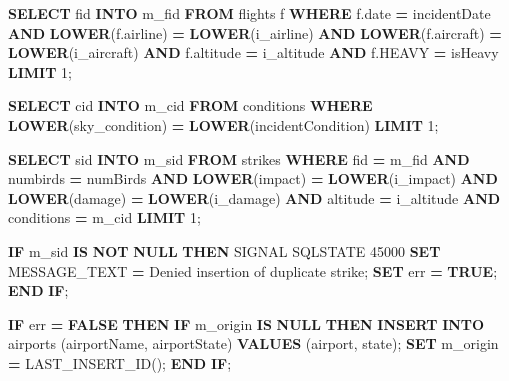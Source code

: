 \documentclass[
]{article}
\newenvironment{Shaded}{\begin{snugshade}}{\end{snugshade}}
\newcommand{\ControlFlowTok}[1]{\textcolor[rgb]{0.13,0.29,0.53}{\textbf{#1}}}
\newcommand{\DataTypeTok}[1]{\textcolor[rgb]{0.13,0.29,0.53}{#1}}
\newcommand{\DecValTok}[1]{\textcolor[rgb]{0.00,0.00,0.81}{#1}}
\newcommand{\FunctionTok}[1]{\textcolor[rgb]{0.13,0.29,0.53}{\textbf{#1}}}
\newcommand{\KeywordTok}[1]{\textcolor[rgb]{0.13,0.29,0.53}{\textbf{#1}}}
\newcommand{\NormalTok}[1]{#1}
\newcommand{\OperatorTok}[1]{\textcolor[rgb]{0.81,0.36,0.00}{\textbf{#1}}}
\newcommand{\StringTok}[1]{\textcolor[rgb]{0.31,0.60,0.02}{#1}}
\begin{document}
\begin{Shaded}
\begin{Highlighting}[]
    \KeywordTok{SELECT}\NormalTok{ fid }\KeywordTok{INTO}\NormalTok{ m\_fid }
    \KeywordTok{FROM}\NormalTok{ flights f }
    \KeywordTok{WHERE}\NormalTok{ f.}\DataTypeTok{date} \OperatorTok{=}\NormalTok{ incidentDate }
        \KeywordTok{AND} \FunctionTok{LOWER}\NormalTok{(f.airline) }\OperatorTok{=} \FunctionTok{LOWER}\NormalTok{(i\_airline) }
        \KeywordTok{AND} \FunctionTok{LOWER}\NormalTok{(f.aircraft) }\OperatorTok{=} \FunctionTok{LOWER}\NormalTok{(i\_aircraft) }
        \KeywordTok{AND}\NormalTok{ f.altitude }\OperatorTok{=}\NormalTok{ i\_altitude }
        \KeywordTok{AND}\NormalTok{ f.HEAVY }\OperatorTok{=}\NormalTok{ isHeavy }
    \KeywordTok{LIMIT} \DecValTok{1}\NormalTok{;}
    
    \KeywordTok{SELECT}\NormalTok{ cid }\KeywordTok{INTO}\NormalTok{ m\_cid }
    \KeywordTok{FROM}\NormalTok{ conditions }
    \KeywordTok{WHERE} \FunctionTok{LOWER}\NormalTok{(sky\_condition) }\OperatorTok{=} \FunctionTok{LOWER}\NormalTok{(incidentCondition) }
    \KeywordTok{LIMIT} \DecValTok{1}\NormalTok{;}
    
    \KeywordTok{SELECT}\NormalTok{ sid }\KeywordTok{INTO}\NormalTok{ m\_sid}
    \KeywordTok{FROM}\NormalTok{ strikes}
    \KeywordTok{WHERE}\NormalTok{ fid }\OperatorTok{=}\NormalTok{ m\_fid }\KeywordTok{AND}\NormalTok{ numbirds }\OperatorTok{=}\NormalTok{ numBirds }\KeywordTok{AND} \FunctionTok{LOWER}\NormalTok{(impact) }\OperatorTok{=} \FunctionTok{LOWER}\NormalTok{(i\_impact) }\KeywordTok{AND} \FunctionTok{LOWER}\NormalTok{(damage) }\OperatorTok{=} \FunctionTok{LOWER}\NormalTok{(i\_damage) }\KeywordTok{AND}\NormalTok{ altitude }\OperatorTok{=}\NormalTok{ i\_altitude }\KeywordTok{AND}\NormalTok{ conditions }\OperatorTok{=}\NormalTok{ m\_cid}
    \KeywordTok{LIMIT} \DecValTok{1}\NormalTok{;}
    
    \ControlFlowTok{IF}\NormalTok{ m\_sid }\KeywordTok{IS} \KeywordTok{NOT} \KeywordTok{NULL} \ControlFlowTok{THEN}
\NormalTok{        SIGNAL SQLSTATE }\StringTok{\textquotesingle{}45000\textquotesingle{}}
        \KeywordTok{SET}\NormalTok{ MESSAGE\_TEXT }\OperatorTok{=} \StringTok{\textquotesingle{}Denied insertion of duplicate strike\textquotesingle{}}\NormalTok{;}
        \KeywordTok{SET}\NormalTok{ err }\OperatorTok{=} \KeywordTok{TRUE}\NormalTok{;}
    \ControlFlowTok{END} \ControlFlowTok{IF}\NormalTok{;}
    
    \ControlFlowTok{IF}\NormalTok{ err }\OperatorTok{=} \KeywordTok{FALSE} \ControlFlowTok{THEN}
      \ControlFlowTok{IF}\NormalTok{ m\_origin }\KeywordTok{IS} \KeywordTok{NULL} \ControlFlowTok{THEN}
        \KeywordTok{INSERT} \KeywordTok{INTO}\NormalTok{ airports (airportName, airportState) }\KeywordTok{VALUES}\NormalTok{ (airport, state);}
        \KeywordTok{SET}\NormalTok{ m\_origin }\OperatorTok{=}\NormalTok{ LAST\_INSERT\_ID();}
    \ControlFlowTok{END} \ControlFlowTok{IF}\NormalTok{;}


\end{Highlighting}
\end{Shaded}
\end{document}
